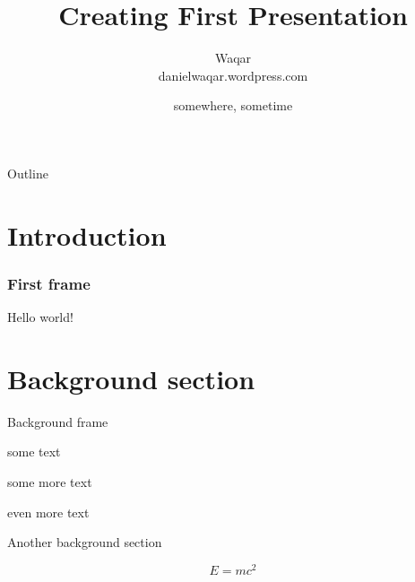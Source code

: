 \documentclass{beamer}
\title{Creating First Presentation}
\date{somewhere, sometime}
\author{Waqar \\ danielwaqar.wordpress.com}
\begin{document}
	\maketitle
	
\begin{frame}{Outline}
\tableofcontents

\end{frame}

\section{Introduction}

\begin{frame}
\frametitle{First frame}
	
	Hello world!
	
\end{frame}

\section{Background section}
\begin{frame}[t]{Background frame}
	
	some text
	
	some more text
	
	even more text
	
\end{frame}

\begin{frame}
	Another background section
	
\[
	E = mc^2
\]
\end{frame}
\end{document}
